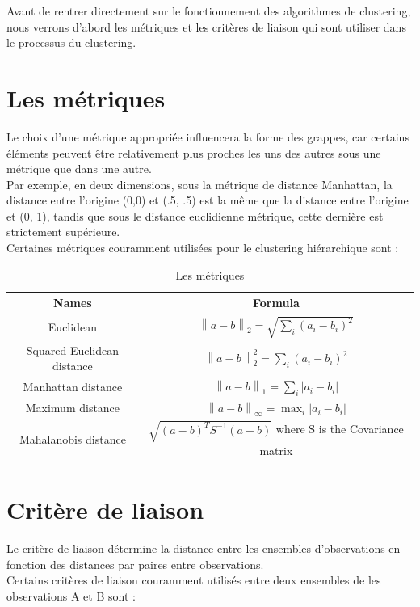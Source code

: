 Avant de rentrer directement sur le fonctionnement des algorithmes de clustering, nous verrons d’abord les métriques et les critères de liaison qui sont utiliser dans le processus du clustering.

\section{Les métriques}
Le choix d'une métrique appropriée influencera la forme des grappes, car certains éléments peuvent être relativement plus proches les uns des autres sous une métrique que dans une autre. \\
Par exemple, en deux dimensions, sous la métrique de distance Manhattan, la distance entre l'origine (0,0) et (.5, .5) est la même que la distance entre l'origine et (0, 1), tandis que sous le distance euclidienne métrique, cette dernière est strictement supérieure. \\
Certaines métriques couramment utilisées pour le clustering hiérarchique sont :

\begin{table}[!htbp]
    \centering
	\begin{tabular}{|c| c|}%
	\hline
	 \textbf{Names} & \textbf{Formula}  \\ \hline
	 Euclidean  & \(\displaystyle \left\lVert a - b\right\rVert_{2} = \sqrt{\sum_{i}^{} (a_{i} - b_{i})^{2} } \)   \\  \hline
	 Squared Euclidean distance  & \(\displaystyle \left\lVert a - b\right\rVert_{2}^{2} = \sum_{i}^{} (a_{i} - b_{i})^{2} \)   \\  \hline
	 Manhattan distance  & \(\displaystyle \left\lVert a - b\right\rVert_{1} = \sum_{i}^{} \left\lvert a_{i} - b_{i} \right\rvert \)   \\  \hline
	 Maximum distance  & \(\displaystyle \left\lVert a - b\right\rVert_{\infty} = \max_{i} \left\lvert a_{i} - b_{i} \right\rvert  \)   \\  \hline
	 Mahalanobis distance  & \(\displaystyle \sqrt{(a-b)^{T}S^{-1}(a-b)} \) where S is the Covariance matrix   \\  \hline
	\end{tabular}
	\caption{Les métriques }
	\label{metrics}
\end{table}

\section{Critère de liaison}
Le critère de liaison détermine la distance entre les ensembles d'observations en fonction des distances par paires entre observations. \\
Certains critères de liaison couramment utilisés entre deux ensembles de les observations A et B sont :

